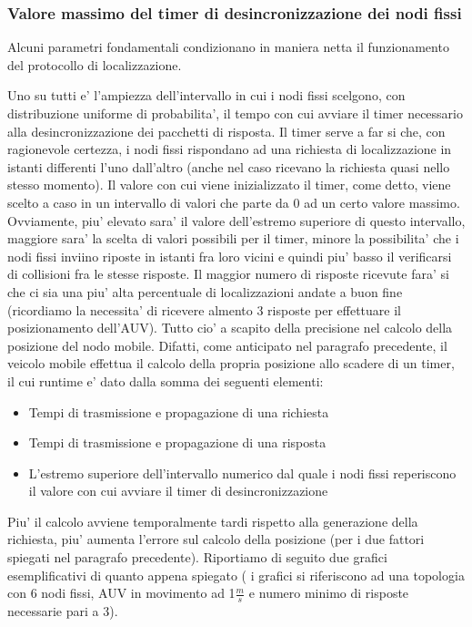 \subsubsection{Valore massimo del timer di desincronizzazione dei nodi fissi}
Alcuni parametri fondamentali condizionano in maniera netta il funzionamento del protocollo di localizzazione.\par Uno su tutti e' l'ampiezza dell'intervallo
in cui i nodi fissi scelgono, con distribuzione uniforme di probabilita', il tempo con cui avviare il timer necessario alla desincronizzazione dei pacchetti di risposta.
Il timer serve a far si che, con ragionevole certezza, i nodi fissi rispondano ad una richiesta di localizzazione in istanti differenti l'uno dall'altro (anche nel caso ricevano la richiesta quasi nello stesso momento).
Il valore con cui viene inizializzato il timer, come detto, viene scelto a caso in un intervallo di valori che parte da 0 ad un certo valore massimo.
Ovviamente, piu' elevato sara' il valore dell'estremo superiore di questo intervallo, maggiore sara' la scelta di valori possibili per il timer, minore la possibilita' che i nodi fissi inviino riposte in istanti fra loro vicini e quindi
piu' basso il verificarsi di collisioni fra le stesse risposte. Il maggior numero di risposte ricevute fara' si che ci sia una piu' alta percentuale di localizzazioni andate a buon fine (ricordiamo la necessita' di ricevere almento 3 risposte per effettuare il posizionamento dell'AUV).\newline
Tutto cio' a scapito della precisione nel calcolo della posizione del nodo mobile. Difatti, come anticipato nel paragrafo precedente, il veicolo mobile effettua il calcolo della propria posizione allo scadere di un timer, il cui runtime e' dato dalla somma dei seguenti elementi:
\begin{itemize}
    \item Tempi di  trasmissione e propagazione di una richiesta
    \item Tempi di  trasmissione e propagazione di una risposta
    \item L'estremo superiore dell'intervallo numerico dal quale i nodi fissi reperiscono il valore con cui avviare il timer di desincronizzazione
\end{itemize}
Piu' il calcolo avviene temporalmente tardi rispetto alla generazione della richiesta, piu' aumenta l'errore sul calcolo della posizione (per i due fattori spiegati nel paragrafo precedente).
Riportiamo di seguito due grafici esemplificativi di quanto appena spiegato ( i grafici si riferiscono ad una topologia con 6 nodi fissi, AUV in movimento ad 1$\frac{m}{s}$ e numero minimo di risposte necessarie pari a 3).
